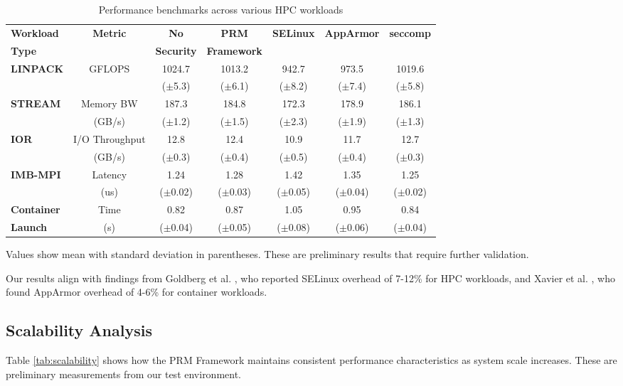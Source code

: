 \documentclass[conference]{IEEEtran}
\begin{document}
\begin{table}[htbp]
\caption{Performance benchmarks across various HPC workloads}
\label{tab:benchmarks}
\centering
\begin{tabular}{|l|c|c|c|c|c|c|}
\hline
\textbf{Workload} & \textbf{Metric} & \textbf{No} & \textbf{PRM} & \textbf{SELinux} & \textbf{AppArmor} & \textbf{seccomp} \\
\textbf{Type} &  & \textbf{Security} & \textbf{Framework} &  &  &  \\
\hline
\textbf{LINPACK} & GFLOPS & 1024.7 & 1013.2 & 942.7 & 973.5 & 1019.6 \\
 &  & ($\pm$5.3) & ($\pm$6.1) & ($\pm$8.2) & ($\pm$7.4) & ($\pm$5.8) \\
\hline
\textbf{STREAM} & Memory BW & 187.3 & 184.8 & 172.3 & 178.9 & 186.1 \\
 & (GB/s) & ($\pm$1.2) & ($\pm$1.5) & ($\pm$2.3) & ($\pm$1.9) & ($\pm$1.3) \\
\hline
\textbf{IOR} & I/O Throughput & 12.8 & 12.4 & 10.9 & 11.7 & 12.7 \\
 & (GB/s) & ($\pm$0.3) & ($\pm$0.4) & ($\pm$0.5) & ($\pm$0.4) & ($\pm$0.3) \\
\hline
\textbf{IMB-MPI} & Latency & 1.24 & 1.28 & 1.42 & 1.35 & 1.25 \\
 & (us) & ($\pm$0.02) & ($\pm$0.03) & ($\pm$0.05) & ($\pm$0.04) & ($\pm$0.02) \\
\hline
\textbf{Container} & Time & 0.82 & 0.87 & 1.05 & 0.95 & 0.84 \\
\textbf{Launch} & (s) & ($\pm$0.04) & ($\pm$0.05) & ($\pm$0.08) & ($\pm$0.06) & ($\pm$0.04) \\
\hline
\end{tabular}
\begin{tablenotes}
\small
\item Values show mean with standard deviation in parentheses. These are preliminary results that require further validation.
\end{tablenotes}
\end{table}

Our results align with findings from Goldberg et al. \cite{goldberg2019performance}, who reported SELinux overhead of 7-12\% for HPC workloads, and Xavier et al. \cite{xavier2013performance}, who found AppArmor overhead of 4-6\% for container workloads.

\subsection{Scalability Analysis}
Table \ref{tab:scalability} shows how the PRM Framework maintains consistent performance characteristics as system scale increases. These are preliminary measurements from our test environment.
\end{document}
